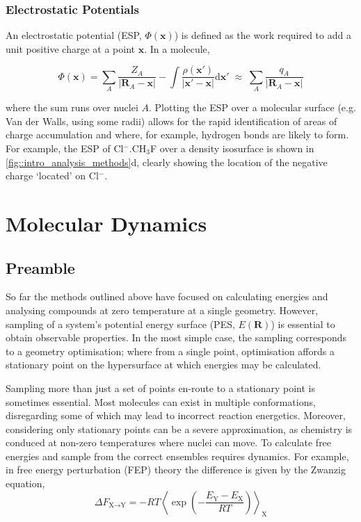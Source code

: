 \documentclass[main.tex]{subfiles}
\begin{document}
\subsubsection{Electrostatic Potentials}

An electrostatic potential (ESP, $\Phi(\boldsymbol{x})$) is defined as the work required to add a unit positive charge at a point $\boldsymbol{x}$. In a molecule,

\begin{equation}
	\Phi(\boldsymbol{x}) = \sum_A \frac{Z_A}{|\boldsymbol{R}_A - \boldsymbol{x}|} - \int \frac{\rho(\boldsymbol{x'})}{|\boldsymbol{x'} - \boldsymbol{x}|} \text{d}\boldsymbol{x}' \;\approx\; \sum_A \frac{q_A}{|\boldsymbol{R}_A - \boldsymbol{x}|}
\end{equation}

where the sum runs over nuclei $A$. Plotting the ESP over a molecular surface (e.g. Van der Walls, using some radii) allows for the rapid identification of areas of charge accumulation and where, for example, hydrogen bonds are likely to form.\cite{Politzer2001} For example, the ESP of Cl${}^{-}$.CH${}_3$F over a density isosurface is shown in \figurename{ \ref{fig::intro_analysis_methods}d}, clearly showing the location of the negative charge `located' on Cl${}^{-}$.


\section{Molecular Dynamics}
\subsection{Preamble}
So far the methods outlined above have focused on calculating energies and analysing compounds at zero temperature at a single geometry. However, sampling of a system's potential energy surface (PES, $E(\boldsymbol{R})$) is essential to obtain observable properties. In the most simple case, the sampling corresponds to a geometry optimisation; where from a single point, optimisation affords a stationary point on the hypersurface at which energies may be calculated. 

Sampling more than just a set of points en-route to a stationary point is sometimes essential. Most molecules can exist in multiple conformations, disregarding some of which may lead to incorrect reaction energetics.\cite{Hawkins2017} Moreover, considering only stationary points can be a severe approximation, as chemistry is conduced at non-zero temperatures where nuclei can move. To calculate free energies and sample from the correct ensembles requires dynamics. For example, in free energy perturbation (FEP)  theory the difference is given by the Zwanzig equation,
\begin{equation}
	\Delta F_{\text{X}\rightarrow\text{Y}} = -R T \left\langle \exp\left( - \frac{E_\text{Y} - E_\text{X}}{RT} \right) \right\rangle_\text{X}
	\label{equation::zwanzig}
\end{equation}
\end{document}

